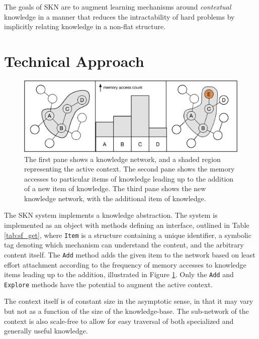 \documentclass[11pt,letterpaper]{article}
\begin{document}
The goals of SKN are to augment learning mechanisms around \emph{contextual}
knowledge in a manner that reduces the intractability of hard problems by
implicitly relating knowledge in a non-flat structure.


\section{Technical Approach}

\begin{figure}[h]
\centering
\includegraphics[scale=.5]{sf_add.eps}
\caption{The first pane shows a knowledge network, and a shaded region
  representing the active context. The second pane shows the memory accesses
  to particular items of knowledge leading up to the addition of a new item
  of knowledge. The third pane shows the new knowledge network, with the
  additional item of knowledge.}
\label{fig:sf_add}
\end{figure}

The SKN system implements a knowledge abstraction. The system is implemented
as an object with methods defining an interface, outlined in Table
\ref{tab:sf_get}, where {\tt Item} is a structure containing a unique
identifier, a symbolic tag denoting which mechanism can understand the
content, and the arbitrary content itself. The {\tt Add} method adds the given
item to the network based on least effort attachment according to the
frequency of memory accesses to knowledge items leading up to the addition,
illustrated in Figure \ref{fig:sf_add}. Only the {\tt Add} and {\tt Explore}
methods have the potential to augment the active context.

The context itself is of constant size in the asymptotic sense, in that it
may vary but not as a function of the size of the knowledge-base. The
sub-network of the context is also scale-free to allow for easy traversal of
both specialized and generally useful knowledge.
\end{document}
